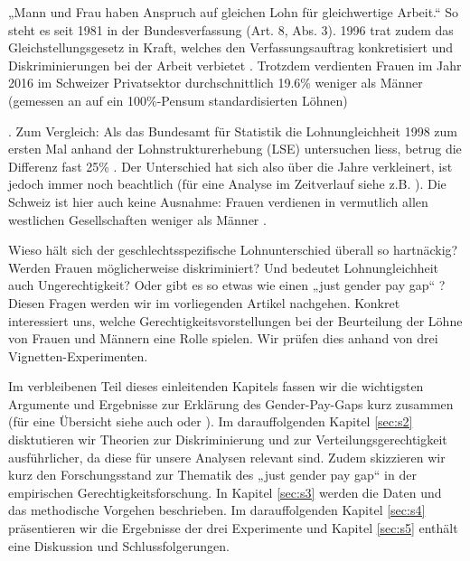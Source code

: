 \documentclass[a4paper,12pt]{article}
\renewcommand{\baselinestretch}{1.1}
\newif\ifcomments
\newcommand{\comment}[1]{%
    \ifcomments\marginpar{\renewcommand{\baselinestretch}{1}\tiny\hspace*{-1.1em}\colorbox{gray!20}%
    {\textcolor{red}{\parbox[t]{.9in}{\raggedright #1}}}}\fi}
\begin{document}
\comment{Hinweis auf Heiratsrecht bis 1988: “Note that this arrangement was enshrined 
in Switzerland’s marriage law until 1988, giving husbands the status as legal 
head of family from whom wives needed the consent in order to take on paid employment.” 
(Paper von Benita und Oli Oesch im ESR; das paper sollte irgendwo zitiert werden)}

\comment{cite „Oesch:2017“ somewhere; see bibtex file}

\comment{OK, beide Artikel zitiert.}

\comment{eine etwas hübschere Einleitung machen und nicht gleich mit BFS-Zahlen anfangen...!}

 „Mann und Frau haben Anspruch auf gleichen Lohn für gleichwertige Arbeit.“ So steht es seit 1981 in der Bundesverfassung (Art. 8, Abs. 3). 1996 trat zudem das Gleichstellungsgesetz in Kraft, welches den Verfassungsauftrag konkretisiert und Diskriminierungen bei der Arbeit verbietet  \citep{EDI-2019}. Trotzdem verdienten Frauen im Jahr 2016 im Schweizer Privatsektor durchschnittlich 19.6\% weniger als Männer
(gemessen an auf ein 100\%-Pensum standardisierten Löhnen) \comment{Zahlen aktualisieren? -> Zahlen aktualisiert.}
\citep{BFS-2019a}. Zum Vergleich: Als das Bundesamt für Statistik die
Lohnungleichheit 1998 zum ersten Mal anhand der Lohnstrukturerhebung (LSE)
untersuchen liess, betrug die Differenz fast 25\% \citep{Strub-etal-2006}. Der
Unterschied hat sich also über die Jahre verkleinert, ist jedoch immer noch
beachtlich (für eine Analyse im Zeitverlauf siehe z.B. \citealp{Schmid-2016}). Die Schweiz ist hier auch keine Ausnahme: Frauen verdienen in vermutlich allen westlichen Gesellschaften weniger als Männer \citep{Blau-2016}.

Wieso hält sich der geschlechtsspezifische Lohnunterschied überall so hartnäckig? Werden Frauen möglicherweise diskriminiert? Und bedeutet Lohnungleichheit auch Ungerechtigkeit? Oder gibt es so etwas wie einen „just gender pay gap“ \citep{Jasso-Webster-1997,Sauer-2014}? Diesen Fragen werden wir im vorliegenden Artikel nachgehen. Konkret interessiert uns, welche Gerechtigkeitsvorstellungen bei der Beurteilung der Löhne von Frauen und Männern eine Rolle spielen. Wir prüfen dies anhand von drei Vignetten-Experimenten.
\comment{noch konkreter?}
Im verbleibenen Teil dieses einleitenden Kapitels fassen wir die wichtigsten Argumente und Ergebnisse zur Erklärung des Gender-Pay-Gaps kurz zusammen (für eine Übersicht siehe auch \citealp{Blau-Kahn-2017} oder \citealp{Weichselbaumer-Winter-Ebmer-2005}). Im darauffolgenden Kapitel \ref{sec:s2} disktutieren wir Theorien zur Diskriminierung und zur Verteilungsgerechtigkeit ausführlicher, da diese für unsere Analysen relevant sind. Zudem skizzieren wir kurz den Forschungsstand zur Thematik des „just gender pay gap“ in der empirischen Gerechtigkeitsforschung. In Kapitel \ref{sec:s3} werden die Daten und das methodische Vorgehen beschrieben. Im darauffolgenden Kapitel \ref{sec:s4} präsentieren wir die Ergebnisse der drei Experimente und Kapitel \ref{sec:s5} enthält eine Diskussion und Schlussfolgerungen.
\end{document}

